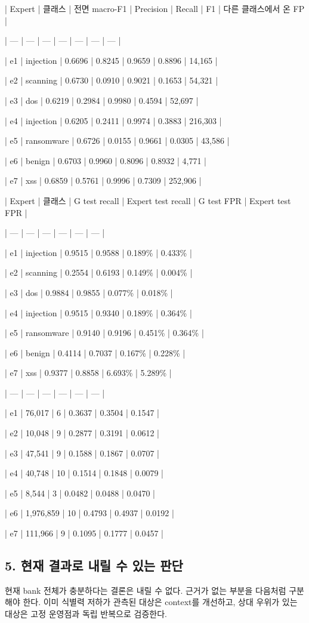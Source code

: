| Expert | 클래스 | 전면 macro-F1 | Precision | Recall | F1 | 다른 클래스에서 온 FP |

| --- | --- | --- | --- | --- | --- | --- |

| e1 | injection | 0.6696 | 0.8245 | 0.9659 | 0.8896 | 14,165 |

| e2 | scanning | 0.6730 | 0.0910 | 0.9021 | 0.1653 | 54,321 |

| e3 | dos | 0.6219 | 0.2984 | 0.9980 | 0.4594 | 52,697 |

| e4 | injection | 0.6205 | 0.2411 | 0.9974 | 0.3883 | 216,303 |

| e5 | ransomware | 0.6726 | 0.0155 | 0.9661 | 0.0305 | 43,586 |

| e6 | benign | 0.6703 | 0.9960 | 0.8096 | 0.8932 | 4,771 |

| e7 | xss | 0.6859 | 0.5761 | 0.9996 | 0.7309 | 252,906 |

| Expert | 클래스 | G test recall | Expert test recall | G test FPR | Expert test FPR |

| --- | --- | --- | --- | --- | --- |

| e1 | injection | 0.9515 | 0.9588 | 0.189\% | 0.433\% |

| e2 | scanning | 0.2554 | 0.6193 | 0.149\% | 0.004\% |

| e3 | dos | 0.9884 | 0.9855 | 0.077\% | 0.018\% |

| e4 | injection | 0.9515 | 0.9340 | 0.189\% | 0.364\% |

| e5 | ransomware | 0.9140 | 0.9196 | 0.451\% | 0.364\% |

| e6 | benign | 0.4114 | 0.7037 | 0.167\% | 0.228\% |

| e7 | xss | 0.9377 | 0.8858 | 6.693\% | 5.289\% |

| --- | --- | --- | --- | --- | --- |

| e1 | 76,017 | 6 | 0.3637 | 0.3504 | 0.1547 |

| e2 | 10,048 | 9 | 0.2877 | 0.3191 | 0.0612 |

| e3 | 47,541 | 9 | 0.1588 | 0.1867 | 0.0707 |

| e4 | 40,748 | 10 | 0.1514 | 0.1848 | 0.0079 |

| e5 | 8,544 | 3 | 0.0482 | 0.0488 | 0.0470 |

| e6 | 1,976,859 | 10 | 0.4793 | 0.4937 | 0.0192 |

| e7 | 111,966 | 9 | 0.1095 | 0.1777 | 0.0457 |

\subsection{5. 현재 결과로 내릴 수 있는 판단}
현재 bank 전체가 충분하다는 결론은 내릴 수 없다. 근거가 없는 부분을 다음처럼 구분해야 한다. 이미 식별력 저하가 관측된 대상은 context를 개선하고, 상대 우위가 있는 대상은 고정 운영점과 독립 반복으로 검증한다.

